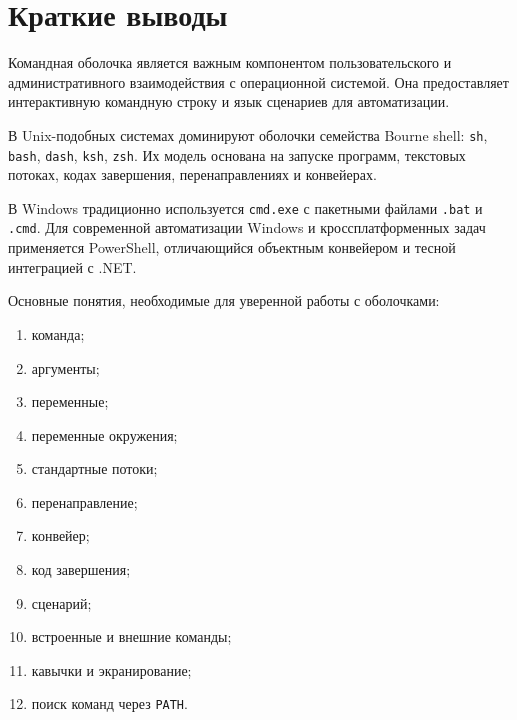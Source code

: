 \documentclass[12pt,a4paper]{article}
\begin{document}
\section{Краткие выводы}

Командная оболочка является важным компонентом пользовательского и административного взаимодействия с операционной системой. Она предоставляет интерактивную командную строку и язык сценариев для автоматизации.

В Unix-подобных системах доминируют оболочки семейства Bourne shell: \texttt{sh}, \texttt{bash}, \texttt{dash}, \texttt{ksh}, \texttt{zsh}. Их модель основана на запуске программ, текстовых потоках, кодах завершения, перенаправлениях и конвейерах.

В Windows традиционно используется \texttt{cmd.exe} с пакетными файлами \texttt{.bat} и \texttt{.cmd}. Для современной автоматизации Windows и кроссплатформенных задач применяется PowerShell, отличающийся объектным конвейером и тесной интеграцией с .NET.

Основные понятия, необходимые для уверенной работы с оболочками:
\begin{enumerate}
    \item команда;
    \item аргументы;
    \item переменные;
    \item переменные окружения;
    \item стандартные потоки;
    \item перенаправление;
    \item конвейер;
    \item код завершения;
    \item сценарий;
    \item встроенные и внешние команды;
    \item кавычки и экранирование;
    \item поиск команд через \texttt{PATH}.
\end{enumerate}
\end{document}
